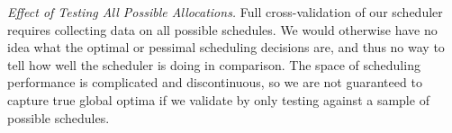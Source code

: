 





\emph{Effect of Testing All Possible Allocations.} Full
cross-validation of our scheduler requires collecting data on all
possible schedules. We would otherwise have no idea what the optimal
or pessimal scheduling decisions are, and thus no way to tell how well
the scheduler is doing in comparison.  The space of scheduling
performance is complicated and discontinuous, so we are not guaranteed
to capture true global optima if we validate by only testing against a
sample of possible schedules.

